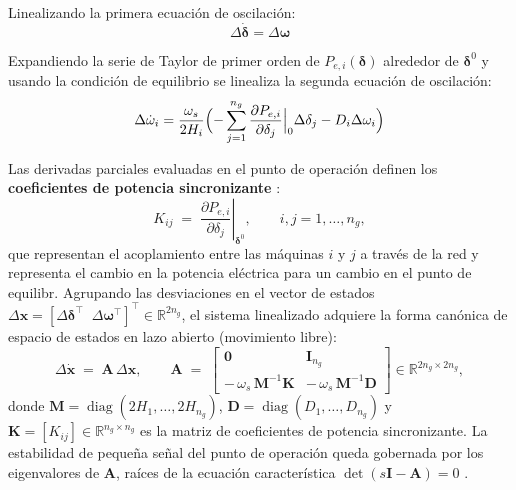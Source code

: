 
Linealizando la primera ecuación de oscilación:
\begin{equation}
    \Delta\dot{\boldsymbol{\delta}} = \Delta\boldsymbol{\omega}
\end{equation}

Expandiendo la serie de Taylor de primer orden de $P_{e,i}(\boldsymbol{\delta})$ alrededor de $\boldsymbol{\delta}^0$ y usando la condición de equilibrio se linealiza la segunda ecuación de oscilación:
\begin{equation}
    \Delta\dot{\omega}_i = \frac{\omega_s}{2H_i}\Bigl(-\sum_{j=1}^{n_g} \frac{\partial P_{e,i}}{\partial \delta_j}\Big|_0 \Delta\delta_j - D_i \Delta\omega_i\Bigr)
\end{equation}

Las derivadas parciales evaluadas en el punto de operación definen los
\textbf{coeficientes de potencia sincronizante} \cite{kundur1994}:
\begin{equation}
    K_{ij} \;=\; \left.\frac{\partial P_{e,i}}{\partial \delta_j}\right|_{\boldsymbol{\delta}^0},
    \qquad i,j = 1,\ldots,n_g,
    \label{eq:Kij}
\end{equation}
que representan el acoplamiento entre las
máquinas $i$ y $j$ a través de la red y representa el cambio en la potencia eléctrica para un cambio en el punto de equilibr. Agrupando las desviaciones en el
vector de estados $\Delta\mathbf{x} =
[\Delta\boldsymbol{\delta}^\top \;\; \Delta\boldsymbol{\omega}^\top]^\top
\in \mathbb{R}^{2n_g}$, el sistema linealizado adquiere la forma canónica
de espacio de estados en lazo abierto (movimiento libre):
\begin{equation}
    \Delta\dot{\mathbf{x}} \;=\; \mathbf{A}\,\Delta\mathbf{x},
    \qquad
    \mathbf{A} \;=\;
    \begin{bmatrix}
        \mathbf{0} & \mathbf{I}_{n_g} \\[4pt]
        -\,\omega_s\,\mathbf{M}^{-1}\mathbf{K} & -\,\omega_s\,\mathbf{M}^{-1}\mathbf{D}
    \end{bmatrix}
    \in \mathbb{R}^{2n_g \times 2n_g},
    \label{eq:statespace}
\end{equation}
donde $\mathbf{M} = \operatorname{diag}(2H_1,\ldots,2H_{n_g})$,
$\mathbf{D} = \operatorname{diag}(D_1,\ldots,D_{n_g})$ y
$\mathbf{K} = [K_{ij}] \in \mathbb{R}^{n_g\times n_g}$ es la matriz de
coeficientes de potencia sincronizante. La estabilidad de pequeña señal del
punto de operación queda gobernada por los eigenvalores de $\mathbf{A}$,
raíces de la ecuación característica
$\det(s\mathbf{I}-\mathbf{A}) = 0$ \cite{kundur1994}.

